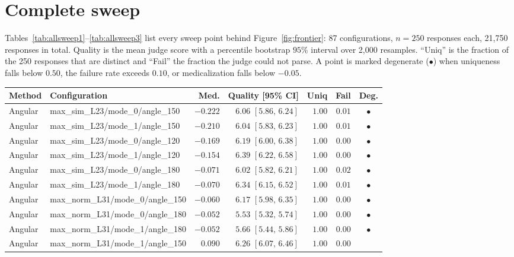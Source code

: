 \section{Complete sweep}
\label{app:sweep}

Tables~\ref{tab:allsweep1}--\ref{tab:allsweep3} list every sweep point behind
Figure~\ref{fig:frontier}: 87 configurations, $n{=}250$ responses each, 21{,}750
responses in total. Quality is the mean judge score with a percentile bootstrap $95\%$
interval over 2{,}000 resamples. ``Uniq'' is the fraction of the 250 responses that are
distinct and ``Fail'' the fraction the judge could not parse. A point is marked
degenerate ($\bullet$) when uniqueness falls below $0.50$, the failure rate exceeds
$0.10$, or medicalization falls below $-0.05$.

\begin{table}[t]
\centering\small
\begin{tabular}{llrrrrc}
\toprule
Method & Configuration & Med. & Quality \scriptsize[95\% CI] & Uniq & Fail & Deg. \\
\midrule
Angular & max\_sim\_L23/mode\_0/angle\_150 & $-0.222$ & $6.06$ \scriptsize$[5.86,\,6.24]$ & $1.00$ & $0.01$ & $\bullet$ \\
Angular & max\_sim\_L23/mode\_1/angle\_150 & $-0.210$ & $6.04$ \scriptsize$[5.83,\,6.23]$ & $1.00$ & $0.01$ & $\bullet$ \\
Angular & max\_sim\_L23/mode\_0/angle\_120 & $-0.169$ & $6.19$ \scriptsize$[6.00,\,6.38]$ & $1.00$ & $0.00$ & $\bullet$ \\
Angular & max\_sim\_L23/mode\_1/angle\_120 & $-0.154$ & $6.39$ \scriptsize$[6.22,\,6.58]$ & $1.00$ & $0.00$ & $\bullet$ \\
Angular & max\_sim\_L23/mode\_0/angle\_180 & $-0.071$ & $6.02$ \scriptsize$[5.82,\,6.21]$ & $1.00$ & $0.02$ & $\bullet$ \\
Angular & max\_sim\_L23/mode\_1/angle\_180 & $-0.070$ & $6.34$ \scriptsize$[6.15,\,6.52]$ & $1.00$ & $0.01$ & $\bullet$ \\
Angular & max\_norm\_L31/mode\_0/angle\_150 & $-0.060$ & $6.17$ \scriptsize$[5.98,\,6.35]$ & $1.00$ & $0.00$ & $\bullet$ \\
Angular & max\_norm\_L31/mode\_0/angle\_180 & $-0.052$ & $5.53$ \scriptsize$[5.32,\,5.74]$ & $1.00$ & $0.00$ & $\bullet$ \\
Angular & max\_norm\_L31/mode\_1/angle\_180 & $-0.052$ & $5.66$ \scriptsize$[5.44,\,5.86]$ & $1.00$ & $0.00$ & $\bullet$ \\
Angular & max\_norm\_L31/mode\_1/angle\_150 & $0.090$ & $6.26$ \scriptsize$[6.07,\,6.46]$ & $1.00$ & $0.00$ &  \\

\end{tabular}
\end{table}
